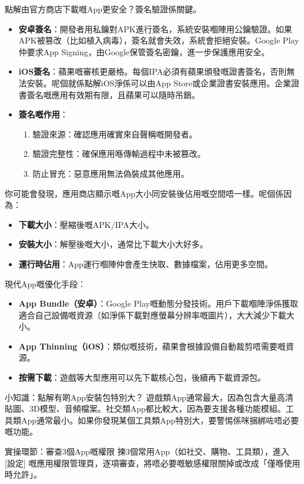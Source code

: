
點解由官方商店下載嘅App更安全？簽名驗證係關鍵。

\begin{itemize}
  \item \textbf{安卓簽名}：開發者用私鑰對APK進行簽名，系統安裝嗰陣用公鑰驗證。如果APK被篡改（比如植入病毒），簽名就會失效，系統會拒絕安裝。Google Play仲要求App Signing，由Google保管簽名密鑰，進一步保護應用安全。
  \item \textbf{iOS簽名}：蘋果嘅審核更嚴格。每個IPA必須有蘋果頒發嘅證書簽名，否則無法安裝。呢個就係點解iOS淨係可以由App Store或企業證書安裝應用。企業證書簽名嘅應用有效期有限，且蘋果可以隨時吊銷。
  \item \textbf{簽名嘅作用}：
  \begin{enumerate}
    \item 驗證來源：確認應用確實來自聲稱嘅開發者。
    \item 驗證完整性：確保應用喺傳輸過程中未被篡改。
    \item 防止冒充：惡意應用無法偽裝成其他應用。
  \end{enumerate}
\end{itemize}


你可能會發現，應用商店顯示嘅App大小同安裝後佔用嘅空間唔一樣。呢個係因為：

\begin{itemize}
  \item \textbf{下載大小}：壓縮後嘅APK/IPA大小。
  \item \textbf{安裝大小}：解壓後嘅大小，通常比下載大小大好多。
  \item \textbf{運行時佔用}：App運行嗰陣仲會產生快取、數據檔案，佔用更多空間。
\end{itemize}

現代App嘅優化手段：

\begin{itemize}
  \item \textbf{App Bundle（安卓）}：Google Play嘅動態分發技術。用戶下載嗰陣淨係獲取適合自己設備嘅資源（如淨係下載對應螢幕分辨率嘅圖片），大大減少下載大小。
  \item \textbf{App Thinning（iOS）}：類似嘅技術，蘋果會根據設備自動裁剪唔需要嘅資源。
  \item \textbf{按需下載}：遊戲等大型應用可以先下載核心包，後續再下載資源包。
\end{itemize}

\begin{tcbinfo}{小知識：點解有啲App安裝包特別大？}
遊戲類App通常最大，因為包含大量高清貼圖、3D模型、音頻檔案。社交類App都比較大，因為要支援各種功能模組。工具類App通常最小。如果你發現某個工具類App特別大，要警惕係咪捆綁咗唔必要嘅功能。

\end{tcbinfo}

\begin{tcbpractice}{實操環節：審查3個App嘅權限}
揀3個常用App（如社交、購物、工具類），進入 [設定] 嘅應用權限管理頁，逐項審查，將唔必要嘅敏感權限關掉或改成「僅喺使用時允許」。

\end{tcbpractice}
